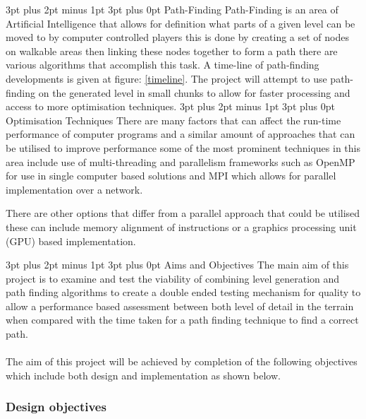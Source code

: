 \documentclass[12pt,a4paper]{article}
\makeatletter
\renewcommand\subsection{\@startsection {subsection}{1}{2mm} %
                               {3pt plus 2pt minus 1pt} %
                               {3pt plus 0pt} %
                               {\normalfont\bfseries}}
\makeatother
\begin{document}
\subsection{Path-Finding}
Path-Finding is an area of Artificial Intelligence that allows for definition what parts of a given level can be moved to by computer controlled players this is done by creating a set of nodes on walkable areas then linking these nodes together to form a path there are various algorithms that accomplish this task. A time-line of path-finding developments is given at figure: \ref{timeline}. The project will attempt to use path-finding on the generated level in small chunks to allow for faster processing and access to more optimisation techniques.  
\subsection{Optimisation Techniques}
There are many factors that can affect the run-time performance of computer programs and a similar amount of approaches that can be utilised to improve performance some of the most prominent techniques in this area include use of multi-threading and parallelism frameworks such as OpenMP for use in single computer based solutions and MPI which allows for parallel implementation over a network.

There are other options that differ from a parallel approach that could be utilised these can include memory alignment of instructions or a graphics processing unit (GPU) based implementation.      

\subsection{Aims and Objectives}
The main aim of this project is to examine and test the viability of combining level generation and path finding algorithms to create a double ended testing mechanism for quality to allow a performance based assessment between both level of detail in the terrain when compared with the time taken for a path finding technique to find a correct path.\\\\
   The aim of this project will be achieved by completion of the following objectives which include both design and implementation as shown below.
   
   \subsubsection{Design objectives}
   
\end{document}
